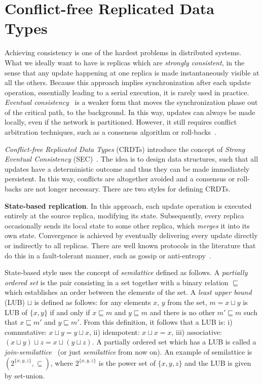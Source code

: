 \section{Conflict-free Replicated Data Types}
\label{sec:crdts}

Achieving consistency is one of the hardest problems in distributed
systems. What we ideally want to have is replicas which are \textit{strongly
consistent}, in the sense that any update happening at one replica is made
instantaneously visible at all the others. Because this approach implies
synchronization after each update operation, essentially leading to a serial
execution, it is rarely used in practice. \textit{Eventual
consistency}~\cite{DBLP:journals/queue/Vogels08a,Saito:2005:OR:1057977.1057980}
is a weaker form that moves the synchronization phase out of the critical path,
to the background. In this way, updates can always be made locally, even if the
network is partitioned. However, it still requires conflict arbitration
techniques, such as a consensus algorithm or
roll-backs~\cite{Terry:1995:MUC:224056.224070}.

\textit{Conflict-free Replicated Data Types} (CRDTs) introduce the concept of
\textit{Strong Eventual Consistency}
(SEC)~\cite{Shapiro:2011:CRD:2050613.2050642}. The idea is to design data
structures, such that all updates have a deterministic outcome and thus they can
be made immediately persistent. In this way, conflicts are altogether avoided
and a consensus or roll-backs are not longer necessary. There are two
styles for defining CRDTs.

\textbf{State-based replication}. In this approach, each update operation is
executed entirely at the source replica, modifying its state. Subsequently,
every replica occasionally sends its local state to some other replica, which
\textit{merges} it into its own state. Convergence is achieved by eventually
delivering every update directly or indirectly to all replicas. There are well
known protocols in the literature that do this in a fault-tolerant manner, such
as gossip or anti-entropy~\cite{Demers:1987:EAR:41840.41841,
Petersen:1997:FUP:268998.266711}.

State-based style uses the concept of \textit{semilattice} defined as follows. A
\textit{partially ordered set} is the pair consisting in a set together with a
binary relation $\sqsubseteq$ which establishes an order between the elements of
the set. A \textit{least upper bound} (LUB) $\sqcup$ is defined as follows: for
any elements $x$, $y$ from the set, $m = x \sqcup y$ is LUB of $\{x, y\}$ if and
only if $x \sqsubseteq m$ and $y \sqsubseteq m$ and there is no other $m'
\sqsubseteq m$ such that $x \sqsubseteq m'$ and $y \sqsubseteq m'$. From this
definition, it follows that a LUB is: i) commutative: $x \sqcup y = y \sqcup x$,
ii) idempotent: $x \sqcup x = x$, iii) associative: $(x \sqcup y) \sqcup z = x
\sqcup (y \sqcup z)$. A partially ordered set which has a LUB is called a
\textit{join-semilattice}~\cite{semilattice} (or just \textit{semilattice} from
now on). An example of semilattice is $(2^{\{x, y, z\}}, \subseteq)$, where
$2^{\{x, y, z\}}$ is the power set of $\{x, y, z\}$ and the LUB is given by
set-union.

